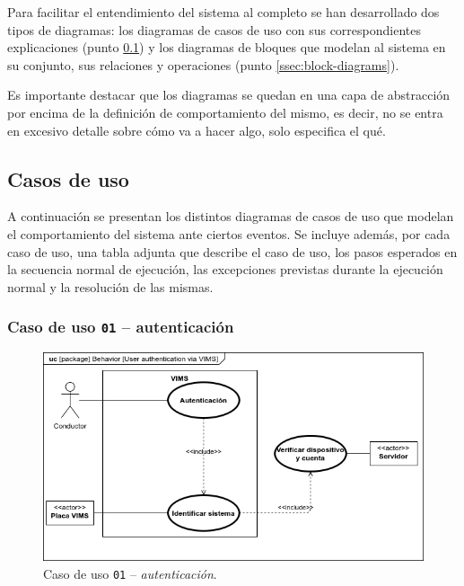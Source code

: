 Para facilitar el entendimiento del sistema al completo se han desarrollado dos
tipos de diagramas: los diagramas de casos de uso con sus correspondientes
explicaciones (punto \ref{ssec:use-case}) y los diagramas de bloques que modelan
al sistema en su conjunto, sus relaciones y operaciones (punto \ref{ssec:block-diagrams}).

Es importante destacar que los diagramas se quedan en una capa de abstracción por encima
de la definición de comportamiento del mismo, es decir, no se entra en excesivo detalle
sobre cómo va a hacer algo, solo especifica el qué.

\subsection{Casos de uso}\label{ssec:use-case}

A continuación se presentan los distintos diagramas de casos de uso que modelan el
comportamiento del sistema ante ciertos eventos. Se incluye además, por cada caso
de uso, una tabla adjunta que describe el caso de uso, los pasos esperados en la
secuencia normal de ejecución, las excepciones previstas durante la ejecución normal
y la resolución de las mismas.

\subsubsection{Caso de uso \texttt{01} -- autenticación}

\begin{figure}[H]
  \centering
  \includegraphics[width=\linewidth]{diagrams/UseCases-UC1 - auth.png}
  \caption{Caso de uso \texttt{01} -- \textit{autenticación}.}
  \label{uc:auth}
\end{figure}


